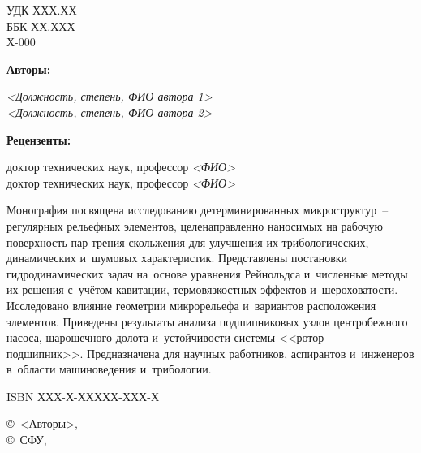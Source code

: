 
\noindent УДК ХХХ.ХХ\\
ББК ХХ.ХХХ\\
Х-000

\vspace{1cm}

\noindent\textbf{Авторы:}\\[0.3em]
\begin{center}
\textit{<Должность, степень, ФИО автора 1>}\\
\textit{<Должность, степень, ФИО автора 2>}
\end{center}

\vspace{0.5cm}

\noindent\textbf{Рецензенты:}\\[0.3em]
\begin{center}
доктор технических наук, профессор \textit{<ФИО>}\\
доктор технических наук, профессор \textit{<ФИО>}
\end{center}

\vspace{1cm}

Монография посвящена исследованию детерминированных микроструктур~-- регулярных рельефных элементов, целенаправленно наносимых на рабочую поверхность пар трения скольжения для улучшения их трибологических, динамических и~шумовых характеристик. Представлены постановки гидродинамических задач на~основе уравнения Рейнольдса и~численные методы их решения с~учётом кавитации, термовязкостных эффектов и~шероховатости. Исследовано влияние геометрии микрорельефа и~вариантов расположения элементов. Приведены результаты анализа подшипниковых узлов центробежного насоса, шарошечного долота и~устойчивости системы <<ротор~-- подшипник>>. Предназначена для научных работников, аспирантов и~инженеров в~области машиноведения и~трибологии.

\vfill

\noindent ISBN ХХХ-Х-ХХХХХ-ХХХ-Х

\vspace{0.3cm}

\noindent\hfill\copyright~<Авторы>, \the\year\\
\hfill\copyright~СФУ, \the\year

\newpage